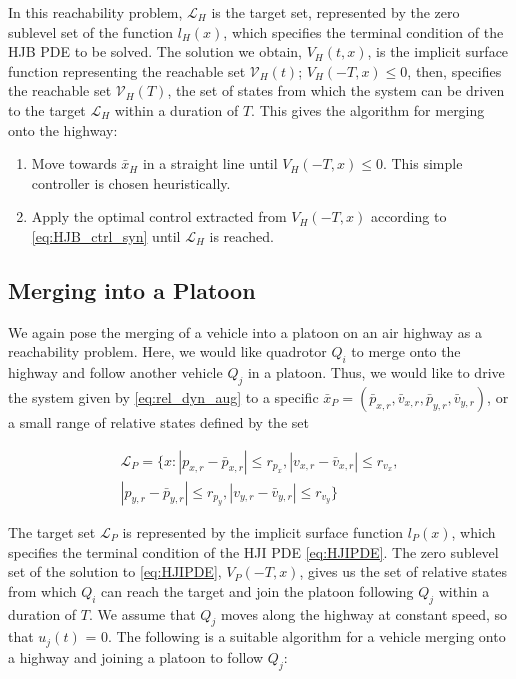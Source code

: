 In this reachability problem, $\mathcal{L}_H$ is the target set, represented by the zero sublevel set of the function $l_H(x)$, which specifies the terminal condition of the HJB PDE to be solved. The solution we obtain, $V_H(t,x)$, is the implicit surface function representing the reachable set $\mathcal V_H(t)$; $V_H(-T,x)\le 0$, then, specifies the reachable set $\mathcal{V}_H(T)$, the set of states from which the system can be driven to the target $\mathcal{L}_H$ within a duration of $T$. This gives the algorithm for merging onto the highway:

\begin{enumerate}
\item Move towards $\bar{x}_H$ in a straight line until $V_H(-T,x)\le 0$. This simple controller is chosen heuristically.
\item Apply the optimal control extracted from $V_H(-T,x)$ according to \eqref{eq:HJB_ctrl_syn} until $\mathcal{L}_H$ is reached.
\end{enumerate}

\subsection{Merging into a Platoon \label{subsec:platoon_merge}}
We again pose the merging of a vehicle into a platoon on an air highway as a reachability problem. Here, we would like quadrotor $Q_i$ to merge onto the highway and follow another vehicle $Q_j$ in a platoon. Thus, we would like to drive the system given by \eqref{eq:rel_dyn_aug} to a specific $\bar{x}_P = (\bar{p}_{x,r}, \bar{v}_{x,r}, \bar{p}_{y,r}, \bar{v}_{y,r})$, or a small range of relative states defined by the set

\begin{equation}
\begin{aligned}
\mathcal{L}_P = \{x: |p_{x,r}-\bar{p}_{x,r}|\le r_{p_x}, |v_{x,r}-\bar{v}_{x,r}|\le r_{v_x}, \\
|p_{y,r} - \bar{p}_{y,r}| \le r_{p_y}, |v_{y,r} - \bar{v}_{y,r}|\le r_{v_y} \}
\end{aligned}
\end{equation}

The target set $\mathcal{L}_P$ is represented by the implicit surface function $l_P(x)$, which specifies the terminal condition of the HJI PDE \eqref{eq:HJIPDE}. The zero sublevel set of the solution to \eqref{eq:HJIPDE}, $V_P(-T,x)$, gives us the set of relative states from which $Q_i$ can reach the target and join the platoon following $Q_j$ within a duration of $T$. We assume that $Q_j$ moves along the highway at constant speed, so that $u_j(t)$ = 0. The following is a suitable algorithm for a vehicle merging onto a highway and joining a platoon to follow $Q_j$:

